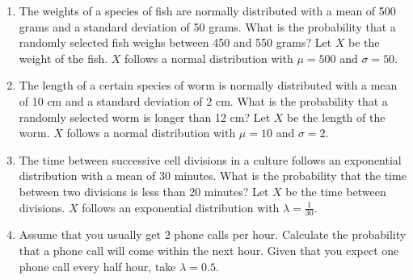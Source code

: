 \documentclass[11pt]{article}
\begin{document}
\begin{enumerate}
    \item The weights of a species of fish are normally distributed with a mean of 500 grams and a standard deviation of 50 grams. What is the probability that a randomly selected fish weighs between 450 and 550 grams? Let $X$ be the weight of the fish. $X$ follows a normal distribution with $\mu = 500$ and $\sigma = 50$.

    \item The length of a certain species of worm is normally distributed with a mean of 10 cm and a standard deviation of 2 cm. What is the probability that a randomly selected worm is longer than 12 cm? Let $X$ be the length of the worm. $X$ follows a normal distribution with $\mu = 10$ and $\sigma = 2$.

    \item The time between successive cell divisions in a culture follows an exponential distribution with a mean of 30 minutes. What is the probability that the time between two divisions is less than 20 minutes? Let $X$ be the time between divisions. $X$ follows an exponential distribution with $\lambda = \frac{1}{30}$.

    \item Assume that you usually get 2 phone calls per hour. Calculate the probability that a phone call will come within the next hour. Given that you expect one phone call every half hour, take $\lambda = 0.5$.
\end{enumerate}
\end{document}
